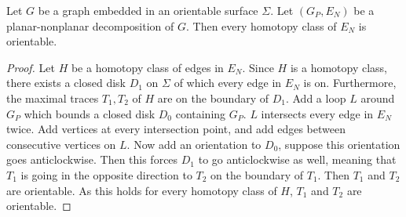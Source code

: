 \begin{lemma}\label{lem:orientable_traces}
	Let $G$ be a graph embedded in an orientable surface $\Sigma$. Let $(G_P, E_N)$ be a planar-nonplanar decomposition of $G$. Then every homotopy class of $E_N$ is orientable. 
\end{lemma}
\begin{proof}
	Let $H$ be a homotopy class of edges in $E_N$. Since $H$ is a homotopy class, there exists a closed disk $D_1$ on $\Sigma$ of which every edge in $E_N$ is on. Furthermore, the maximal traces $T_1, T_2$ of $H$ are on the boundary of $D_1$. Add a loop $L$ around $G_P$ which bounds a closed disk $D_0$ containing $G_P$. $L$ intersects every edge in $E_N$ twice. Add vertices at every intersection point, and add edges between consecutive vertices on $L$. Now add an orientation to $D_0$, suppose this orientation goes anticlockwise. Then this forces $D_1$ to go anticlockwise as well, meaning that $T_1$ is going in the opposite direction to $T_2$ on the boundary of $T_1$. Then $T_1$ and $T_2$ are orientable. As this holds for every homotopy class of $H$, $T_1$ and $T_2$ are orientable. 
\end{proof}

